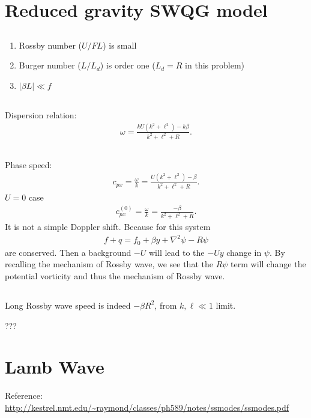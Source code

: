 \documentclass[11pt,letterpaper]{book}
\theoremstyle{definition}
\begin{document}
\section{Reduced gravity SWQG model}\label{prob:Aug_2012_2}
\subsection{}
\begin{enumerate}
    \item Rossby number ($U/FL$) is small
    \item Burger number ($L/L_d$) is order one ($L_d = R$ in this problem)
    \item $|\beta L|\ll f$
\end{enumerate}

\subsection{}
Dispersion relation:
\begin{align*}
\omega = \frac{kU(k^2+\ell^2)-k\beta}{k^2+\ell^2+R}.
\end{align*}

\subsection{}
Phase speed:
\begin{align*}
c_{px} = \frac{\omega}{k} = \frac{U(k^2+\ell^2)-\beta}{k^2+\ell^2+R}.
\end{align*}
$U = 0$ case
\begin{align*}
c_{px}^{(0)} = \frac{\omega}{k} = \frac{-\beta}{k^2+\ell^2+R}.
\end{align*}
It is not a simple Doppler shift. Because for this system
\begin{align*}
f+q = f_0+\beta y+\nabla^2\psi-R\psi
\end{align*}
are conserved. Then a background $-U$ will lead to the $-Uy$ change in $\psi$. By recalling the mechanism of Rossby wave, we see that the $R\psi$ term will change the potential vorticity and thus the mechanism of Rossby wave. 

\subsection{}
Long Rossby wave speed is indeed $-\beta R^2$, from $k,\ell\ll 1$ limit.

???

\section{Lamb Wave}
Reference: \url{http://kestrel.nmt.edu/~raymond/classes/ph589/notes/ssmodes/ssmodes.pdf}
\end{document}
